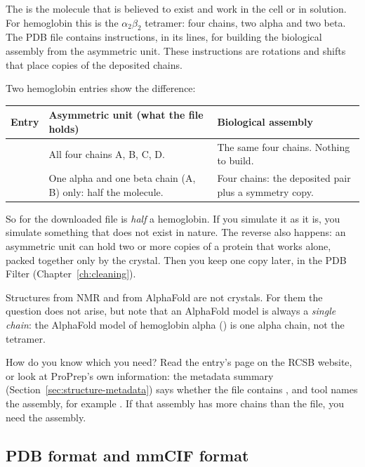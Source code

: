 The  is the molecule that is believed to exist and
work in the cell or in solution. For hemoglobin this is the
$\alpha_2\beta_2$ tetramer: four chains, two alpha and two beta. The PDB file
contains instructions, in its  lines, for building the
biological assembly from the asymmetric unit. These instructions are rotations
and shifts that place copies of the deposited chains.

Two hemoglobin entries show the difference:

\begin{tabularx}{\linewidth}{@{}lLL@{}}
\toprule
\textbf{Entry} & \textbf{Asymmetric unit (what the file holds)} & \textbf{Biological assembly} \\
\midrule
{} & All four chains A, B, C, D. & The same four chains. Nothing to build. \\
 & One alpha and one beta chain (A, B) only: half the molecule. & Four chains: the deposited pair plus a symmetry copy. \\
\bottomrule
\end{tabularx}

\medskip
So for  the downloaded file is \emph{half} a hemoglobin. If you
simulate it as it is, you simulate something that does not exist in nature. The
reverse also happens: an asymmetric unit can hold two or more copies of a
protein that works alone, packed together only by the crystal. Then you keep one
copy later, in the PDB Filter (Chapter~\ref{ch:cleaning}).

Structures from NMR and from AlphaFold are not crystals. For them the question
does not arise, but note that an AlphaFold model is always a \emph{single
chain}: the AlphaFold model of hemoglobin alpha () is one alpha
chain, not the tetramer.

\begin{tip}
How do you know which you need? Read the entry's page on the RCSB website, or
look at ProPrep's own information: the metadata summary
(Section~\ref{sec:structure-metadata}) says whether the file contains
, and tool  names
the assembly, for example . If that
assembly has more chains than the file, you need the assembly.
\end{tip}

\subsection{PDB format and mmCIF format}

